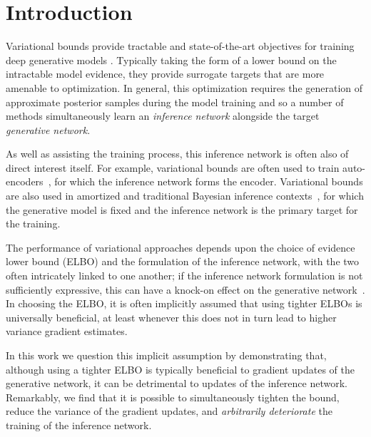 
\section{Introduction}
\label{sec:intro}
Variational bounds provide tractable and state-of-the-art objectives for training deep generative models \citep{Kingma2014auto,Rezende2014stochastic}.  Typically taking
the form of a lower bound on the intractable model evidence, 
they provide surrogate targets that are more amenable to optimization.
In general, this optimization
requires the generation of approximate posterior samples during the model
training and so a number of methods simultaneously learn an \emph{inference
network} alongside the target \emph{generative network}. 

As well as assisting the training process, this inference network is often also of
direct interest itself.  For example, variational bounds are often used to train 
auto-encoders~\citep{Bourlard1988auto,Hinton1994autoencoders,Gregor2016towards,Chen2016variational},
for which the inference network forms the encoder.
Variational bounds are also used in amortized and traditional Bayesian inference 
 contexts~\cite{hoffman2013stochastic,ranganath2014black,
 	paige2016inference,le2017inference}, for which the generative model
 is fixed and the inference network is the primary target for the training.

The performance of variational approaches depends upon the choice of
evidence lower bound (\gls{ELBO})
and the formulation of the inference network, with the two often intricately linked to one another;
if the inference network formulation is not sufficiently expressive, this can have 
a knock-on effect on the generative network~\citep{Burda2016importance}.  
In choosing the \gls{ELBO}, it is often implicitly
assumed that using tighter \glspl{ELBO} is universally beneficial,
at least whenever this does not in turn lead to higher variance 
gradient estimates.


In this work we question this implicit assumption
by demonstrating that,
although using a tighter \gls{ELBO} is typically beneficial to gradient 
updates of the 
generative network, it can be detrimental to updates of
 the inference network.
Remarkably, we find that it is possible to simultaneously tighten the bound,
reduce the variance of the gradient updates, and \emph{arbitrarily deteriorate} the
training of the inference network.

